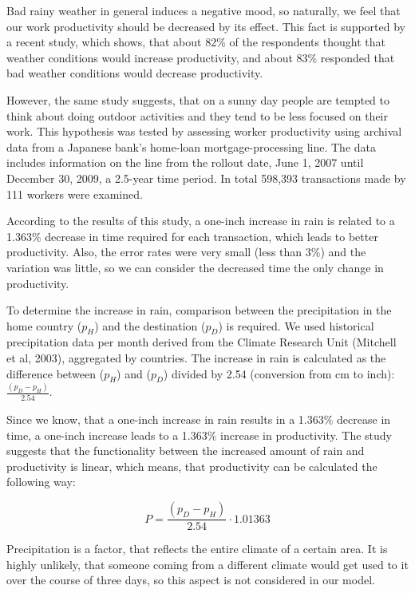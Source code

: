 
Bad rainy weather in general induces a negative mood, so naturally, we feel that our work productivity should be decreased by its effect. This fact is supported by a recent study, which shows, that about 82\% of the respondents thought that weather conditions would increase productivity, and about 83\% responded that bad weather conditions would decrease productivity.

However, the same study suggests, that on a sunny day people are tempted to think about doing outdoor activities and they tend to be less focused on their work. This hypothesis was tested by assessing worker productivity using archival data from a Japanese bank’s home-loan mortgage-processing line. The data includes information on the line from the rollout date, June 1, 2007 until December 30, 2009, a 2.5-year time period. In total 598,393 transactions made by 111 workers were examined. 

According to the results of this study, a one-inch increase in rain is related to a 1.363\% decrease in time required for each transaction, which leads to better productivity. Also, the error rates were very small (less than 3\%) and the variation was  little, so we can consider the decreased time the only change in productivity. 

To determine the increase in rain, comparison between the precipitation in the home country ($p_H$) and the destination ($p_D$) is required. We used historical precipitation data per month derived from the Climate Research Unit (Mitchell et al, 2003), aggregated by countries. The increase in rain is calculated as the difference between ($p_H$) and ($p_D$) divided by 2.54 (conversion from cm to inch): $\frac{(p_D - p_H)}{2.54}$.

Since we know, that a one-inch increase in rain results in a 1.363\% decrease in time, a one-inch increase leads to a 1.363\% increase in productivity. The study suggests that the functionality between the increased amount of rain and productivity is linear, which means, that productivity can be calculated the following way:

$$P=\frac{(p_D - p_H)}{2.54}\cdot 1.01363$$


Precipitation is a factor, that reflects the entire climate of a certain area. It is highly unlikely, that someone coming from a different climate would get used to it over the course of three days, so this aspect is not considered in our model.

